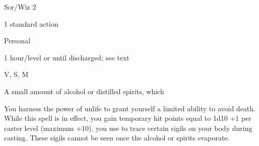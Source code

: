 
\begin{description*}
\item[Level:] Sor/Wiz 2
\item[Casting Time:] 1 standard action
\item[Range:] Personal
\item[Duration:] 1 hour/level or until discharged; see text
\item[Components:] V, S, M
\item[Arcane Material Component:] A small amount of alcohol or distilled spirits, which
\end{description*}

You harness the power of unlife to grant yourself a limited ability to avoid death.
While this spell is in effect, you gain temporary hit points equal to 1d10 +1 per
caster level (maximum +10).
you use to trace certain sigils on your body during casting. These sigils cannot
be seen once the alcohol or spirits evaporate.